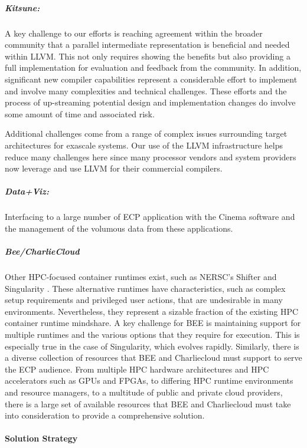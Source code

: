 \subparagraph{Kitsune:}
A key challenge to our efforts is reaching agreement within the broader community that
a parallel intermediate representation is beneficial and needed within
LLVM.  This not only requires showing the benefits but also providing a
full implementation for evaluation and feedback from the community.
In addition, significant new compiler capabilities represent a
considerable effort to implement and involve many complexities and technical
challenges.  These efforts and the process of up-streaming potential
design and implementation changes do involve some amount of time and
associated risk. 

Additional challenges come from a range of complex issues surrounding
target architectures for exascale systems.  Our use of the LLVM
infrastructure helps reduce many challenges here since many processor
vendors and system providers now leverage and use LLVM for their
commercial compilers.

\subparagraph{Data+Viz:}
Interfacing to a large number of ECP application with the Cinema
software and the management of the volumous data from these
applications. 

\subparagraph{Bee/CharlieCloud}
Other HPC-focused container runtimes exist, such as NERSC's Shifter
\cite{canonrsjacobsend} and
Singularity \cite{kurtzergmsochatvbauermw}.  These alternative runtimes have characteristics, such as
complex setup requirements and privileged user actions, that are undesirable in
many environments.  Nevertheless, they represent a sizable fraction of the
existing HPC container runtime mindshare.  A key challenge for BEE is
maintaining support for multiple runtimes and the various options that they require
for execution.  This is especially true in the case of Singularity, which
evolves rapidly.  Similarly, there is a diverse collection of resources that
BEE and Charliecloud must support to serve the ECP audience.  From multiple HPC
hardware architectures and HPC accelerators such as GPUs and FPGAs, to
differing HPC runtime environments and resource managers, to a multitude of
public and private cloud providers, there is a large set of available resources
that BEE and Charliecloud must take into consideration to provide a
comprehensive solution.

\paragraph{Solution Strategy} \leavevmode \\

